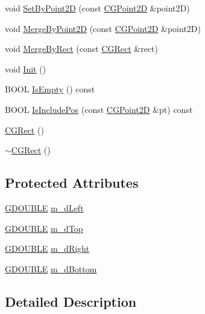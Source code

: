 \begin{DoxyCompactItemize}
\item 
void \hyperlink{class_c_g_rect_a402090608774ef66b1f9937365ce03d5}{Set\+By\+Point2\+D} (const \hyperlink{class_c_g_point2_d}{C\+G\+Point2\+D} \&point2\+D)
\item 
void \hyperlink{class_c_g_rect_a11d6166d19f0dfb96d6b43bbd1397776}{Merge\+By\+Point2\+D} (const \hyperlink{class_c_g_point2_d}{C\+G\+Point2\+D} \&point2\+D)
\item 
void \hyperlink{class_c_g_rect_a74e5ae200c9777609e419357819b9772}{Merge\+By\+Rect} (const \hyperlink{class_c_g_rect}{C\+G\+Rect} \&rect)
\item 
void \hyperlink{class_c_g_rect_a1840406fc01b6c3556c75db0aaf68e90}{Init} ()
\item 
B\+O\+O\+L \hyperlink{class_c_g_rect_ad4e171f9502bd99fcfac1f7f6016b277}{Is\+Empty} () const 
\item 
B\+O\+O\+L \hyperlink{class_c_g_rect_aea8c27a29768d0b5b337e3f7c7ea018f}{Is\+Include\+Pos} (const \hyperlink{class_c_g_point2_d}{C\+G\+Point2\+D} \&pt) const 
\item 
\hyperlink{class_c_g_rect_a7b9a14e0a209eb754356f4b12dcd5729}{C\+G\+Rect} ()
\item 
\hyperlink{class_c_g_rect_ae957b63696b4543b5c3692e51b9339e9}{$\sim$\+C\+G\+Rect} ()
\end{DoxyCompactItemize}
\subsection*{Protected Attributes}
\begin{DoxyCompactItemize}
\item 
\hyperlink{_g_types_8h_afd05ac85f90ee8e2a733928545462cd4}{G\+D\+O\+U\+B\+L\+E} \hyperlink{class_c_g_rect_a2994cefae469a543382d5d8a21488afb}{m\+\_\+d\+Left}
\item 
\hyperlink{_g_types_8h_afd05ac85f90ee8e2a733928545462cd4}{G\+D\+O\+U\+B\+L\+E} \hyperlink{class_c_g_rect_ab275b94322ca9375b3e67d43c50102e1}{m\+\_\+d\+Top}
\item 
\hyperlink{_g_types_8h_afd05ac85f90ee8e2a733928545462cd4}{G\+D\+O\+U\+B\+L\+E} \hyperlink{class_c_g_rect_a1459c3625fb2bc8ab26f5cf7b2f61f2f}{m\+\_\+d\+Right}
\item 
\hyperlink{_g_types_8h_afd05ac85f90ee8e2a733928545462cd4}{G\+D\+O\+U\+B\+L\+E} \hyperlink{class_c_g_rect_af3bc151aa2f3b5979dfb42837f73ec05}{m\+\_\+d\+Bottom}
\end{DoxyCompactItemize}


\subsection{Detailed Description}

